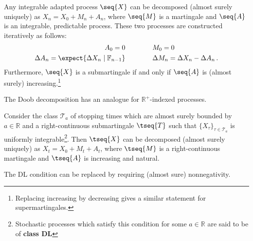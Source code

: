     \begin{theorem}
        Any integrable adapted process $\seq{X}$ can be decomposed (almost surely uniquely) as $X_n=X_0+M_n+A_n$, where $\seq{M}$ is a martingale and $\seq{A}$ is an integrable, predictable process. These two processes are constructed iteratively as follows:
        \begin{align}
            A_0 = 0\qquad&\qquad M_0 = 0\\
            \Delta A_n = \expect{\Delta X_n\mid\mathbb{F}_{n-1}}\qquad&\qquad\Delta M_n = \Delta X_n - \Delta A_n\,.
        \end{align}
        Furthermore, $\seq{X}$ is a submartingale if and only if $\seq{A}$ is (almost surely) increasing.\footnote{Replacing increasing by decreasing gives a similar statement for supermartingales.}
    \end{theorem}

    The Doob decomposition has an analogue for $\mathbb{R}^+$-indexed processes.
    \begin{theorem}
        Consider the class $\mathcal{T}_{\!\!a}$ of stopping times which are almost surely bounded by $a\in\mathbb{R}$ and a right-continuous submartingale $\tseq{T}$ such that $\{X_\tau\}_{\tau\in\mathcal{T}_{\!\!a}}$ is uniformly integrable\footnote{Stochastic processes which satisfy this condition for some $a\in\mathbb{R}$ are said to be of \textbf{class DL}}. Then $\tseq{X}$ can be decomposed (almost surely uniquely) as $X_t = X_0 + M_t + A_t$, where $\tseq{M}$ is a right-continuous martingale and $\tseq{A}$ is increasing and natural.
    \end{theorem}
    \begin{remark}
        The DL condition can be replaced by requiring (almost sure) nonnegativity.
    \end{remark}

